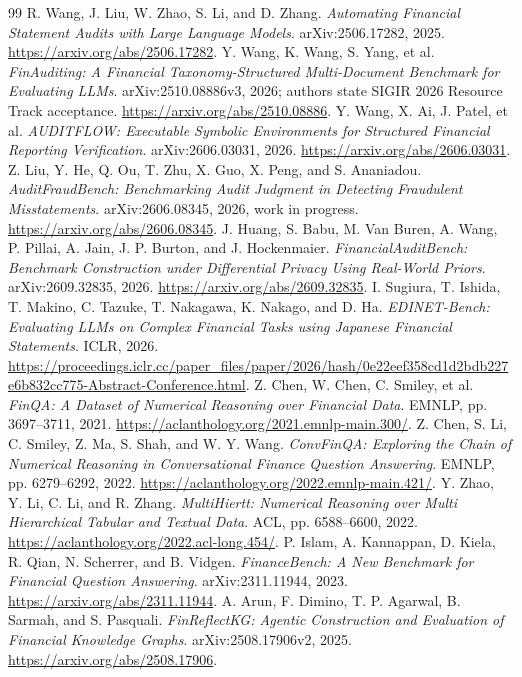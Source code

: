 \documentclass[11pt]{article}
\begin{document}
\begin{thebibliography}{99}
 R. Wang, J. Liu, W. Zhao, S. Li, and D. Zhang. \emph{Automating Financial Statement Audits with Large Language Models}. arXiv:2506.17282, 2025. \url{https://arxiv.org/abs/2506.17282}.
 Y. Wang, K. Wang, S. Yang, et al. \emph{FinAuditing: A Financial Taxonomy-Structured Multi-Document Benchmark for Evaluating LLMs}. arXiv:2510.08886v3, 2026; authors state SIGIR 2026 Resource Track acceptance. \url{https://arxiv.org/abs/2510.08886}.
 Y. Wang, X. Ai, J. Patel, et al. \emph{AUDITFLOW: Executable Symbolic Environments for Structured Financial Reporting Verification}. arXiv:2606.03031, 2026. \url{https://arxiv.org/abs/2606.03031}.
 Z. Liu, Y. He, Q. Ou, T. Zhu, X. Guo, X. Peng, and S. Ananiadou. \emph{AuditFraudBench: Benchmarking Audit Judgment in Detecting Fraudulent Misstatements}. arXiv:2606.08345, 2026, work in progress. \url{https://arxiv.org/abs/2606.08345}.
 J. Huang, S. Babu, M. Van Buren, A. Wang, P. Pillai, A. Jain, J. P. Burton, and J. Hockenmaier. \emph{FinancialAuditBench: Benchmark Construction under Differential Privacy Using Real-World Priors}. arXiv:2609.32835, 2026. \url{https://arxiv.org/abs/2609.32835}.
 I. Sugiura, T. Ishida, T. Makino, C. Tazuke, T. Nakagawa, K. Nakago, and D. Ha. \emph{EDINET-Bench: Evaluating LLMs on Complex Financial Tasks using Japanese Financial Statements}. ICLR, 2026. \url{https://proceedings.iclr.cc/paper_files/paper/2026/hash/0e22eef358cd1d2bdb227e6b832cc775-Abstract-Conference.html}.
 Z. Chen, W. Chen, C. Smiley, et al. \emph{FinQA: A Dataset of Numerical Reasoning over Financial Data}. EMNLP, pp. 3697--3711, 2021. \url{https://aclanthology.org/2021.emnlp-main.300/}.
 Z. Chen, S. Li, C. Smiley, Z. Ma, S. Shah, and W. Y. Wang. \emph{ConvFinQA: Exploring the Chain of Numerical Reasoning in Conversational Finance Question Answering}. EMNLP, pp. 6279--6292, 2022. \url{https://aclanthology.org/2022.emnlp-main.421/}.
 Y. Zhao, Y. Li, C. Li, and R. Zhang. \emph{MultiHiertt: Numerical Reasoning over Multi Hierarchical Tabular and Textual Data}. ACL, pp. 6588--6600, 2022. \url{https://aclanthology.org/2022.acl-long.454/}.
 P. Islam, A. Kannappan, D. Kiela, R. Qian, N. Scherrer, and B. Vidgen. \emph{FinanceBench: A New Benchmark for Financial Question Answering}. arXiv:2311.11944, 2023. \url{https://arxiv.org/abs/2311.11944}.
 A. Arun, F. Dimino, T. P. Agarwal, B. Sarmah, and S. Pasquali. \emph{FinReflectKG: Agentic Construction and Evaluation of Financial Knowledge Graphs}. arXiv:2508.17906v2, 2025. \url{https://arxiv.org/abs/2508.17906}.
\end{thebibliography}
\end{document}
